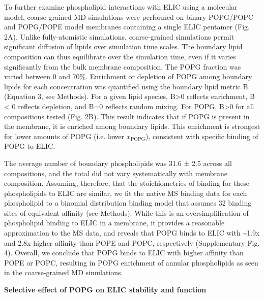 To further examine phospholipid interactions with ELIC using a molecular
model, coarse-grained MD simulations were performed on binary POPG/POPC
and POPG/POPE model membranes containing a single ELIC pentamer (Fig.
2A). Unlike fully-atomistic simulations, coarse-grained simulations
permit significant diffusion of lipids over simulation time scales. The
boundary lipid composition can thus equilibrate over the simulation
time, even if it varies significantly from the bulk membrane
composition. The POPG fraction was varied between 0 and 70\%. Enrichment
or depletion of POPG among boundary lipids for each concentration was
quantified using the boundary lipid metric B (Equation 3, see Methods).
For a given lipid species, B\textgreater{}0 reflects enrichment, B
\textless{} 0 reflects depletion, and B=0 reflects random mixing. For
POPG, B\textgreater{}0 for all compositions tested (Fig. 2B). This
result indicates that if POPG is present in the membrane, it is enriched
among boundary lipids. This enrichment is strongest for lower amounts of
POPG (i.e. lower \(x_{\text{POPG}}\)), consistent with specific binding
of POPG to ELIC.

The average number of boundary phospholipids was 31.6 ± 2.5 across all
compositions, and the total did not vary systematically with membrane
composition. Assuming, therefore, that the stoichiometries of binding
for these phospholipids to ELIC are similar, we fit the native MS
binding data for each phospholipid to a binomial distribution binding
model that assumes 32 binding sites of equivalent affinity (see
Methods). While this is an oversimplification of phospholipid binding to
ELIC in a membrane, it provides a reasonable approximation to the MS
data, and reveals that POPG binds to ELIC with \textasciitilde{}1.9x and
2.8x higher affinity than POPE and POPC, respectively (Supplementary
Fig. 4). Overall, we conclude that POPG binds to ELIC with higher
affinity than POPE or POPC, resulting in POPG enrichment of annular
phospholipids as seen in the coarse-grained MD simulations.

\textbf{Selective effect of POPG on ELIC stability and function}

